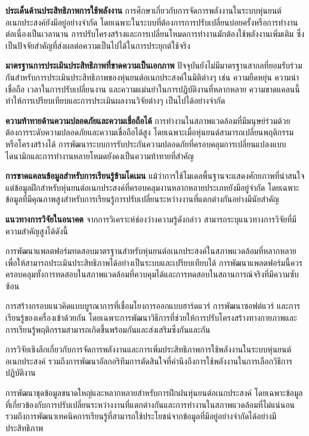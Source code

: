 \documentclass[a4paper]{article}
\begin{document}
\textbf{ประเด็นด้านประสิทธิภาพการใช้พลังงาน} การศึกษาเกี่ยวกับการจัดการพลังงานในระบบหุ่นยนต์อเนกประสงค์ยังมีอยู่อย่างจำกัด โดยเฉพาะในระบบที่ต้องการการปรับเปลี่ยนบ่อยครั้งหรือการทำงานต่อเนื่องเป็นเวลานาน การปรับโครงสร้างและการเปลี่ยนโหมดการทำงานมักต้องใช้พลังงานเพิ่มเติม ซึ่งเป็นปัจจัยสำคัญที่ส่งผลต่อความเป็นไปได้ในการประยุกต์ใช้จริง

\textbf{มาตรฐานการประเมินประสิทธิภาพที่ขาดความเป็นเอกภาพ} ปัจจุบันยังไม่มีมาตรฐานสากลที่ยอมรับร่วมกันสำหรับการประเมินประสิทธิภาพของหุ่นยนต์อเนกประสงค์ในมิติต่างๆ เช่น ความยืดหยุ่น ความน่าเชื่อถือ เวลาในการปรับเปลี่ยนงาน และความแม่นยำในการปฏิบัติงานที่หลากหลาย ความขาดแคลนนี้ทำให้การเปรียบเทียบและการประเมินผลงานวิจัยต่างๆ เป็นไปได้อย่างจำกัด

\textbf{ความท้าทายด้านความปลอดภัยและความเชื่อถือได้} การทำงานในสภาพแวดล้อมที่มีมนุษย์ร่วมด้วยต้องการระดับความปลอดภัยและความเชื่อถือได้สูง โดยเฉพาะเมื่อหุ่นยนต์สามารถเปลี่ยนพฤติกรรมหรือโครงสร้างได้ การพัฒนาระบบการรับประกันความปลอดภัยที่ครอบคลุมการเปลี่ยนแปลงแบบไดนามิกและการทำงานหลายโหมดยังคงเป็นความท้าทายที่สำคัญ

\textbf{การขาดแคลนข้อมูลสำหรับการเรียนรู้ข้ามโดเมน} แม้ว่าการใช้โมเดลพื้นฐานจะแสดงศักยภาพที่น่าสนใจ แต่ข้อมูลฝึกสำหรับหุ่นยนต์อเนกประสงค์ที่ครอบคลุมงานหลากหลายประเภทยังมีอยู่จำกัด โดยเฉพาะข้อมูลที่มีคุณภาพสูงสำหรับการเรียนรู้การปรับเปลี่ยนระหว่างงานที่แตกต่างกันอย่างมีนัยสำคัญ

\textbf{แนวทางการวิจัยในอนาคต} จากการวิเคราะห์ช่องว่างความรู้ดังกล่าว สามารถระบุแนวทางการวิจัยที่มีความสำคัญสูงได้ดังนี้

การพัฒนาแพลตฟอร์มทดสอบมาตรฐานสำหรับหุ่นยนต์อเนกประสงค์ในสภาพแวดล้อมที่หลากหลาย เพื่อให้สามารถประเมินประสิทธิภาพได้อย่างเป็นระบบและเปรียบเทียบได้ การพัฒนาแพลตฟอร์มนี้ควรครอบคลุมทั้งการทดสอบในสภาพแวดล้อมที่ควบคุมได้และการทดสอบในสถานการณ์จริงที่มีความซับซ้อน

การสร้างกรอบแนวคิดแบบบูรณาการที่เชื่อมโยงการออกแบบฮาร์ดแวร์ การพัฒนาซอฟต์แวร์ และการเรียนรู้ของเครื่องเข้าด้วยกัน โดยเฉพาะการพัฒนาวิธีการที่ช่วยให้การปรับโครงสร้างทางกายภาพและการเรียนรู้พฤติกรรมสามารถเกิดขึ้นพร้อมกันและส่งเสริมซึ่งกันและกัน

การวิจัยเชิงลึกเกี่ยวกับการจัดการพลังงานและการเพิ่มประสิทธิภาพการใช้พลังงานในระบบหุ่นยนต์อเนกประสงค์ รวมถึงการพัฒนาอัลกอริทึมการตัดสินใจที่คำนึงถึงการใช้พลังงานในการเลือกวิธีการปฏิบัติงาน

การพัฒนาชุดข้อมูลขนาดใหญ่และหลากหลายสำหรับการฝึกฝนหุ่นยนต์อเนกประสงค์ โดยเฉพาะข้อมูลที่เกี่ยวข้องกับการปรับเปลี่ยนระหว่างงานที่แตกต่างกันและการทำงานในสภาพแวดล้อมที่ไม่แน่นอน รวมถึงการพัฒนาเทคนิคการเรียนรู้ที่สามารถใช้ประโยชน์จากข้อมูลที่มีอยู่อย่างจำกัดได้อย่างมีประสิทธิภาพ
\end{document}
